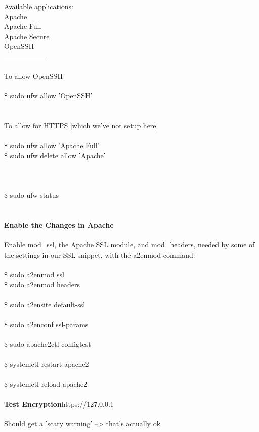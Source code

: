 \documentclass[10pt,a4paper]{article}
\begin{document}
{{{{{{{{{{{{{{{{{{Available applications:\\
  Apache\\
  Apache Full\\
  Apache Secure\\
  OpenSSH\\
------------------\\
\\
To allow OpenSSH}{\large \\
\\
\$ sudo ufw allow 'OpenSSH'\\
\\
\\
To allow for HTTPS [which we've not setup here]\\
\\
\$ sudo ufw allow  'Apache Full'\\
\$ sudo ufw delete allow 'Apache'\\
\\
\\
\\
\$ sudo ufw status\\
\\
\\
\textbf{Enable the Changes in Apache}}{\large \\
\\
Enable mod\_ssl, the Apache SSL module, and mod\_headers, needed by some of the settings in our SSL snippet, with the a2enmod command:\\
\\
\$ sudo a2enmod ssl\\
\$ sudo a2enmod headers\\
\\
\$ sudo a2ensite default-ssl\\
\\
\$ sudo a2enconf ssl-params\\
\\
\$ sudo apache2ctl configtest\\
\\
\$ systemctl restart apache2\\
\\
\$ systemctl reload apache2\\
\\
\textbf{Test Encryption}}{\large https://127.0.0.1}{\large \\
\\
Should get a 'scary warning' --> that's actually ok\\
\\
\\
}}}}}}}}}}}}}}}}}}
\end{document}
